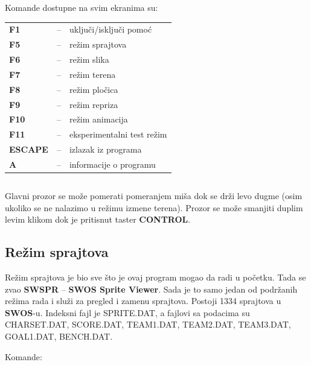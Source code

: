 \documentclass[a4paper,12pt]{article}
\begin{document}

\noindent Komande dostupne na svim ekranima su:


\begin{tabular}{lll}
{\bf F1}          &--& uklju\v ci/isklju\v ci pomo\'c\\
{\bf F5}          &--& re\v zim sprajtova\\
{\bf F6}          &--& re\v zim slika\\
{\bf F7}          &--& re\v zim terena\\
{\bf F8}          &--& re\v zim plo\v cica\\
{\bf F9}          &--& re\v zim repriza\\
{\bf F10}         &--& re\v zim animacija\\
{\bf F11}         &--& eksperimentalni test re\v zim\\
{\bf ESCAPE}      &--& izlazak iz programa\\
{\bf A}           &--& informacije o programu
\end{tabular}

\begin{verbatim}
\end{verbatim}

Glavni prozor se mo\v ze pomerati pomeranjem mi\v sa dok se dr\v zi levo dugme (osim ukoliko se ne nalazimo
u re\v zimu izmene terena). Prozor se mo\v ze smanjiti duplim levim klikom dok je pritisnut taster {\bf CONTROL}.

\newpage
\subsection{Re\v zim sprajtova}

Re\v zim sprajtova je bio sve \v sto je ovaj program mogao da radi u po\v cetku. Tada se zvao {\bf SWSPR} --
{\bf SWOS Sprite Viewer}. Sada je to samo jedan od podr\v zanih re\v zima rada i slu\v zi za pregled i zamenu
sprajtova. Postoji 1334 sprajtova u {\bf SWOS}-u. Indeksni fajl je SPRITE.DAT, a fajlovi sa podacima su CHARSET.DAT,
SCORE.DAT, TEAM1.DAT, TEAM2.DAT, TEAM3.DAT, GOAL1.DAT, BENCH.DAT.\\

\vspace{\baselineskip}

\noindent Komande:\\
\end{document}
